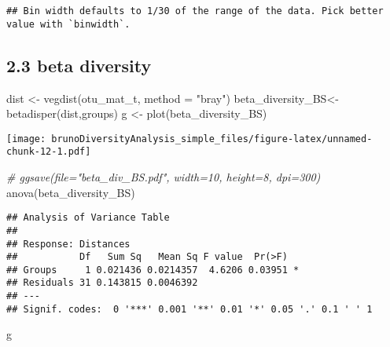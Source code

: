 \documentclass[
]{article}
\newenvironment{Shaded}{\begin{snugshade}}{\end{snugshade}}
\newcommand{\AttributeTok}[1]{\textcolor[rgb]{0.77,0.63,0.00}{#1}}
\newcommand{\CommentTok}[1]{\textcolor[rgb]{0.56,0.35,0.01}{\textit{#1}}}
\newcommand{\FunctionTok}[1]{\textcolor[rgb]{0.00,0.00,0.00}{#1}}
\newcommand{\NormalTok}[1]{#1}
\newcommand{\OtherTok}[1]{\textcolor[rgb]{0.56,0.35,0.01}{#1}}
\newcommand{\StringTok}[1]{\textcolor[rgb]{0.31,0.60,0.02}{#1}}
\begin{document}
\begin{verbatim}
## Bin width defaults to 1/30 of the range of the data. Pick better value with `binwidth`.
\end{verbatim}

\hypertarget{beta-diversity-1}{%
\subsection{2.3 beta diversity}\label{beta-diversity-1}}

\begin{Shaded}
\begin{Highlighting}[]
\NormalTok{dist }\OtherTok{\textless{}{-}} \FunctionTok{vegdist}\NormalTok{(otu\_mat\_t, }\AttributeTok{method =} \StringTok{"bray"}\NormalTok{)}
\NormalTok{beta\_diversity\_BS}\OtherTok{\textless{}{-}}\FunctionTok{betadisper}\NormalTok{(dist,groups)}
\NormalTok{g }\OtherTok{\textless{}{-}} \FunctionTok{plot}\NormalTok{(beta\_diversity\_BS)}
\end{Highlighting}
\end{Shaded}

\texttt{[image: brunoDiversityAnalysis\_simple\_files/figure-latex/unnamed-chunk-12-1.pdf]}

\begin{Shaded}
\begin{Highlighting}[]
\CommentTok{\# ggsave(file="beta\_div\_BS.pdf", width=10, height=8, dpi=300)}
\FunctionTok{anova}\NormalTok{(beta\_diversity\_BS)}
\end{Highlighting}
\end{Shaded}

\begin{verbatim}
## Analysis of Variance Table
## 
## Response: Distances
##           Df   Sum Sq   Mean Sq F value  Pr(>F)  
## Groups     1 0.021436 0.0214357  4.6206 0.03951 *
## Residuals 31 0.143815 0.0046392                  
## ---
## Signif. codes:  0 '***' 0.001 '**' 0.01 '*' 0.05 '.' 0.1 ' ' 1
\end{verbatim}

\begin{Shaded}
\begin{Highlighting}[]
\NormalTok{g}
\end{Highlighting}
\end{Shaded}
\end{document}
